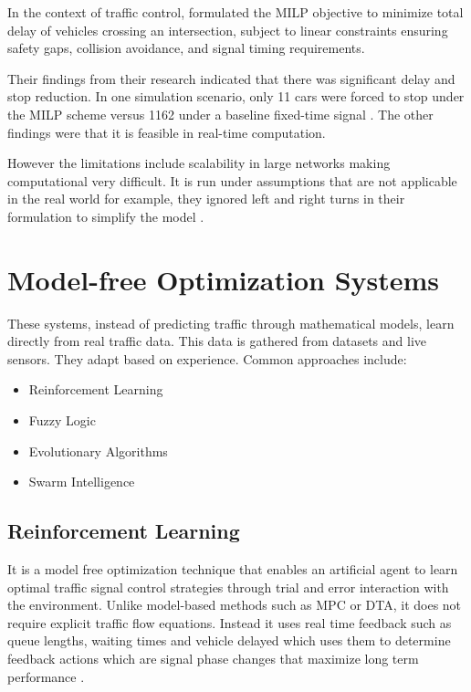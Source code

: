 \documentclass[11pt, a4paper]{report}
\begin{document}
In the context of traffic control, \cite{ye2019survey} formulated the MILP objective to minimize total delay of vehicles crossing an intersection, subject to linear constraints ensuring safety gaps, collision avoidance, and signal timing requirements.

Their findings from their research indicated that there was significant delay and stop reduction. In one simulation scenario, only 11 cars were forced to stop under the MILP scheme versus 1162 under a baseline fixed-time signal \cite{ye2019survey}. The other findings were that it is feasible in real-time computation.

However the limitations include scalability in large networks making computational very difficult. It is run under assumptions that are not applicable in the real world for example, they ignored left and right turns in their formulation to simplify the model \cite{ye2019survey}.

\section{Model-free Optimization Systems}

These systems, instead of predicting traffic through mathematical models, learn directly from real traffic data. This data is gathered from datasets and live sensors. They adapt based on experience. Common approaches include:

\begin{itemize}
    \item Reinforcement Learning
    \item Fuzzy Logic
    \item Evolutionary Algorithms
    \item Swarm Intelligence
\end{itemize}

\subsection{Reinforcement Learning}

It is a model free optimization technique that enables an artificial agent to learn optimal traffic signal control strategies through trial and error interaction with the environment. Unlike model-based methods such as MPC or DTA, it does not require explicit traffic flow equations. Instead it uses real time feedback such as queue lengths, waiting times and vehicle delayed which uses them to determine feedback actions which are signal phase changes that maximize long term performance \cite{futuretransp5040137}.
\end{document}
